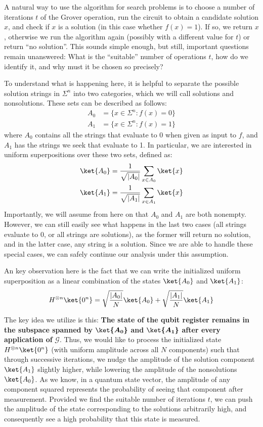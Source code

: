 A natural way to use the algorithm for search problems is to choose a number of iterations $t$ of the Grover operation, run the circuit to obtain a candidate solution $x$, and check if $x$ is a solution (in this case whether $f(x) = 1$). If so, we return $x$, otherwise we run the algorithm again (possibly with a different value for $t$) or return ``no solution''. This sounds simple enough, but still, important questions remain unanswered: What is the ``suitable'' number of operations $t$, how do we identify it, and why must it be chosen so precisely?

To understand what is happening here, it is helpful to separate the possible solution strings in $\Sigma^n$ into two categories, which we will call solutions and nonsolutions. These sets can be described as follows:
\begin{align*}
    A_0 &= \{x \in \Sigma^n: f(x) = 0\}\\
    A_1 &= \{x \in \Sigma^n: f(x) = 1\}
\end{align*}
where $A_0$ contains all the strings that evaluate to 0 when given as input to $f$, and $A_1$ has the strings we seek that evaluate to 1. In particular, we are interested in uniform superpositions over these two sets, defined as:
\begin{align*}
    \ket{A_0} &= \frac{1}{\sqrt{|A_0|}}\sum_{x \in A_0} \ket{x} \\
    \ket{A_1} &= \frac{1}{\sqrt{|A_1|}}\sum_{x \in A_1} \ket{x}
\end{align*}
Importantly, we will assume from here on that $A_0$ and $A_1$ are both nonempty. However, we can still easily see what happens in the last two cases (all strings evaluate to 0, or all strings are solutions), as the former will return no solution, and in the latter case, any string is a solution. Since we are able to handle these special cases, we can safely continue our analysis under this assumption.

An key observation here is the fact that we can write the initialized uniform superposition as a linear combination of the states $\ket{A_0}$
and $\ket{A_1}$:
\[H^{\otimes n} \ket{0^n} = \sqrt{\frac{|A_0|}{N}}\ket{A_0} + \sqrt{\frac{|A_1|}{N}}\ket{A_1}\]

The key idea we utilize is this: \textbf{The state of the qubit register remains in the subspace spanned by} $\boldsymbol{\ket{A_0}}$
\textbf{and} $\boldsymbol{\ket{A_1}}$ \textbf{after every application of} $\boldsymbol{\mathcal{G}}$. Thus, we would like to process the initialized state $H^{\otimes n} \ket{0^n}$ (with uniform amplitude across all $N$ components) such that through successive iterations, we nudge the amplitude of the solution component $\ket{A_1}$ slightly higher, while lowering the amplitude of the nonsolutions $\ket{A_0}$. As we know, in a quantum state vector, the amplitude of any component squared represents the probability of seeing that component after measurement. Provided we find the suitable number of iterations $t$, we can push the amplitude of the state corresponding to the solutions arbitrarily high, and consequently see a high probability that this state is measured.

